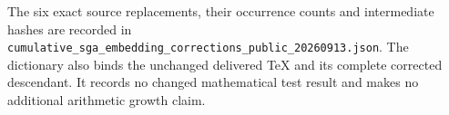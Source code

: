 The six exact source replacements, their occurrence counts and
intermediate hashes are recorded in
\nolinkurl{cumulative_sga_embedding_corrections_public_20260913.json}.
The dictionary also binds the unchanged delivered TeX and its complete
corrected descendant.  It records no changed mathematical test result
and makes no additional arithmetic growth claim.


\endgroup
